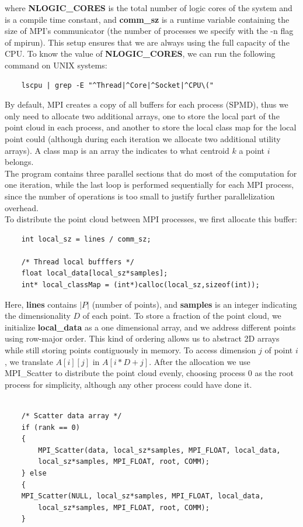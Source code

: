 \documentclass{article}
\begin{document}
where \textbf{NLOGIC\_CORES} is the total number of logic cores of the system and is a compile time constant, and \textbf{comm\_sz} is a runtime variable containing the size of MPI's communicator (the number of processes we specify with the -n flag of mpirun). This setup ensures that we are always using the full capacity of the CPU. To know the value of \textbf{NLOGIC\_CORES}, we can run the following command on UNIX systems:
\begin{lstlisting}
    lscpu | grep -E "^Thread|^Core|^Socket|^CPU\("
\end{lstlisting}
By default, MPI creates a copy of all buffers for each process (SPMD), thus we only need to allocate two additional arrays, one to store the local part of the point cloud in each process, and another to store the local class map for the local point could (although during each iteration we allocate two additional utility arrays). A class map is an array the indicates to what centroid $k$ a point $i$ belongs. \\The program contains three parallel sections that do most of the computation for one iteration, while the last loop is performed sequentially for each MPI process, since the number of operations is too small to justify further parallelization overhead.\\ To distribute the point cloud between MPI processes, we first allocate this buffer:
\begin{lstlisting}
    int local_sz = lines / comm_sz;

    /* Thread local bufffers */
    float local_data[local_sz*samples];
    int* local_classMap = (int*)calloc(local_sz,sizeof(int));
\end{lstlisting}
Here, \textbf{lines} contains $|P|$ (number of points), and \textbf{samples} is an integer indicating the dimensionality $D$ of each point. To store a fraction of the point cloud, we initialize \textbf{local\_data} as a one dimensional array, and we address different points using row-major order. This kind of ordering allows us to abstract 2D arrays while still storing points contiguously in memory. To access dimension $j$ of point $i$, we translate $A[i][j]$ in $A[i*D + j]$. After the allocation we use MPI\_Scatter to distribute the point cloud evenly, choosing process 0 as the root process for simplicity, although any other process could have done it.
\begin{lstlisting}

    /* Scatter data array */
    if (rank == 0)
    {
        MPI_Scatter(data, local_sz*samples, MPI_FLOAT, local_data, 
        local_sz*samples, MPI_FLOAT, root, COMM);
    } else
    {
	MPI_Scatter(NULL, local_sz*samples, MPI_FLOAT, local_data, 
        local_sz*samples, MPI_FLOAT, root, COMM);
    }
\end{lstlisting}
\end{document}
